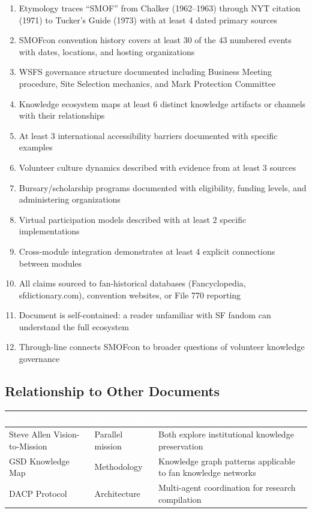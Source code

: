 \documentclass[11pt,letterpaper]{article}
\newcommand{\tableheader}[1]{\textbf{\sffamily\textcolor{white}{#1}}}
\begin{document}
\begin{enumerate}[leftmargin=2em]
\item Etymology traces ``SMOF'' from Chalker (1962--1963) through NYT citation (1971) to Tucker's Guide (1973) with at least 4 dated primary sources
\item SMOFcon convention history covers at least 30 of the 43 numbered events with dates, locations, and hosting organizations
\item WSFS governance structure documented including Business Meeting procedure, Site Selection mechanics, and Mark Protection Committee
\item Knowledge ecosystem maps at least 6 distinct knowledge artifacts or channels with their relationships
\item At least 3 international accessibility barriers documented with specific examples
\item Volunteer culture dynamics described with evidence from at least 3 sources
\item Bursary/scholarship programs documented with eligibility, funding levels, and administering organizations
\item Virtual participation models described with at least 2 specific implementations
\item Cross-module integration demonstrates at least 4 explicit connections between modules
\item All claims sourced to fan-historical databases (Fancyclopedia, sfdictionary.com), convention websites, or File 770 reporting
\item Document is self-contained: a reader unfamiliar with SF fandom can understand the full ecosystem
\item Through-line connects SMOFcon to broader questions of volunteer knowledge governance
\end{enumerate}

\subsection{Relationship to Other Documents}

\begin{center}
\begin{tabularx}{\textwidth}{L{3.5cm}L{3cm}X}
\toprule
{}
\tableheader{Document} & \tableheader{Relationship} & \tableheader{Notes} \\
\midrule
Steve Allen Vision-to-Mission & Parallel mission & Both explore institutional knowledge preservation \\
GSD Knowledge Map & Methodology & Knowledge graph patterns applicable to fan knowledge networks \\
DACP Protocol & Architecture & Multi-agent coordination for research compilation \\
\bottomrule
\end{tabularx}
\end{center}
\end{document}

